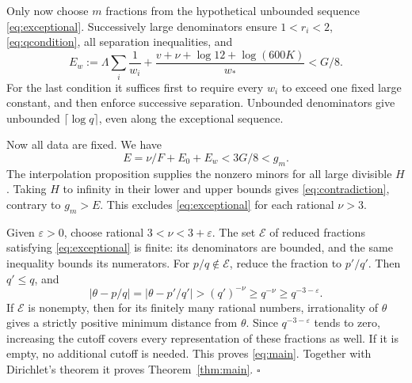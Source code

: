 Only now choose \(m\) fractions from the hypothetical unbounded
sequence \eqref{eq:exceptional}. Successively large denominators ensure
\(1<r_i<2\), \eqref{eq:qcondition}, all separation inequalities,
and
\begin{equation}\label{eq:wchoice}
 E_w:=\Lambda\sum_i\frac1{w_i}
        +\frac{v+\nu+\log12+\log(600K)}{w_*}<G/8.
\end{equation}
For the last condition it suffices first to require every \(w_i\)
to exceed one fixed large constant, and then enforce successive
separation. Unbounded denominators give unbounded
\(\lceil\log q\rceil\), even along the exceptional sequence.

Now all data are fixed. We have
\[
            E=\nu/F+E_0+E_w<3G/8<g_m.
\]
The interpolation proposition supplies the nonzero minors for all large
divisible \(H\). Taking \(H\) to infinity in their lower and upper
bounds gives \eqref{eq:contradiction}, contrary to \(g_m>E\). This excludes \eqref{eq:exceptional} for
each rational \(\nu>3\).

Given \(\varepsilon>0\), choose rational \(3<\nu<3+\varepsilon\).
The set \(\mathcal E\) of reduced fractions satisfying
\eqref{eq:exceptional} is finite: its denominators are bounded,
and the same inequality bounds its numerators.
For \(p/q\notin\mathcal E\), reduce the fraction to \(p'/q'\).
Then \(q'\leq q\), and
\[
 |\theta-p/q|=|\theta-p'/q'|>(q')^{-\nu}
                                  \geq q^{-\nu}\geq q^{-3-\varepsilon}.
\]
If \(\mathcal E\) is nonempty, then for its finitely many rational numbers,
irrationality of \(\theta\) gives a strictly positive minimum
distance from \(\theta\). Since \(q^{-3-\varepsilon}\) tends to
zero, increasing the cutoff covers every representation of these
fractions as well. If it is empty, no additional cutoff is needed.
This proves \eqref{eq:main}. Together with Dirichlet's theorem it
proves Theorem~\ref{thm:main}.
\hfill\(\square\)
